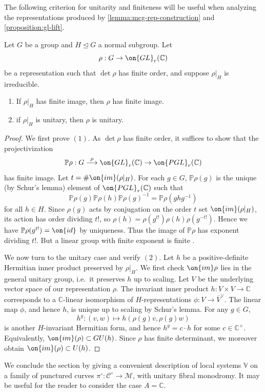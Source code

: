 The following criterion for unitarity and finiteness will be useful when analyzing the representations produced by \autoref{lemma:mcg-rep-construction} and \autoref{proposition:gl-lift}.
\begin{lemma}
\notready
	\label{lemma:finite-rho-implies-finite-lift}
Let $G$ be a group and $H\trianglelefteq G$ a normal subgroup. Let $$\rho: G\to \on{GL}_r(\mathbb{C})$$ be a representation such that $\det\rho$ has finite order, and suppose $\rho|_H$ is irreducible.
\begin{enumerate}
\item If $\rho|_H$ has finite image, then $\rho$ has finite image.
\item if $\rho|_H$ is unitary, then $\rho$ is unitary.
\end{enumerate}
\end{lemma}
\begin{proof}
	We first prove $(1)$.
		As $\det\rho$ has finite order, it suffices to show that the
	projectivization $$\mathbb{P}\rho: G\overset{\rho}{\longrightarrow}
	\on{GL}_r(\mathbb{C})\to \on{PGL}_r(\mathbb{C})$$ has finite image. Let
$t=\#\on{im}(\rho|_H)$. For each $g\in G$, $\mathbb{P}\rho(g)$ is the unique
(by Schur's lemma) element of $\on{PGL}_r(\mathbb{C})$ such that
$$\mathbb{P}\rho(g)\mathbb{P}\rho(h)\mathbb{P}\rho(g)^{-1}=\mathbb{P}\rho(ghg^{-1})$$ for all $h\in H$.
Since $\rho(g)$ acts by conjugation on the order $t$ set $\on{im}(\rho|_H)$, its action
has order dividing $t!$, so $\rho(h)=\rho(g^{t!})\rho(h)\rho(g^{-t!})$. Hence we have $\mathbb{P}\rho(g^{t!})=\on{id}$ by
uniqueness. Thus the image of $\mathbb{P}\rho$ has exponent dividing $t!$. But a linear group with finite exponent is finite \cite{burnside1905criteria}.

We now turn to the unitary case and verify $(2)$.
Let $h$ be a positive-definite Hermitian inner product preserved by $\rho|_H$.
We first check $\on{im}\rho$ lies in the general unitary group, i.e.~it preserves $h$ up to scaling.
	Let $V$ be the underlying vector space of our
	representation $\rho$. The invariant inner product $h: V \times V \to \mathbb C$ corresponds to a $\mathbb{C}$-linear isomorphism of $H$-representations $\phi: V \to \overline{V}^\vee$.
	The linear map $\phi$, and hence $h$, is unique up to scaling by Schur's lemma.
	For any $g\in G$, $$h^g: (v, w)\mapsto h(\rho(g)v, \rho(g)w)$$ is
	another $H$-invariant Hermitian form, and hence $h^g=c\cdot h$ for some
	$c\in\mathbb{C}^\times.$
	Equivalently, $\on{im}(\rho)\subset GU(h)$.
	Since $\rho$ has finite determinant, we moreover obtain
	$\on{im}(\rho)\subset U(h)$.\qedhere
\end{proof}
We conclude the section by giving a convenient description of local systems
$\mathbb V$ on a family of punctured curves $\pi^\circ: \mathscr C^\circ \to
\mathscr M$, with unitary fibral monodromy. It may be useful for the reader to consider the case $A=\mathbb{C}$.

